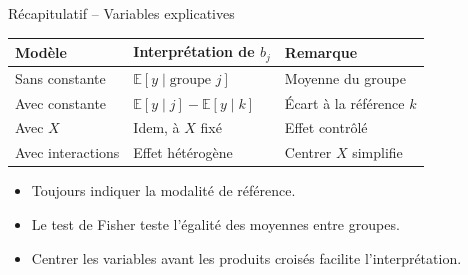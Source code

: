 \documentclass[11pt,aspectratio=169]{beamer}
\newcommand{\E}{\mathbb{E}}
\begin{document}
\begin{frame}{Récapitulatif -- Variables explicatives}

\begin{center}
    \small
    \renewcommand{\arraystretch}{1.3}
    \begin{tabular}{lll}
        \toprule
        \textbf{Modèle} & \textbf{Interprétation de $b_j$} & \textbf{Remarque} \\
        \midrule
        Sans constante & $\E[y \mid \text{groupe } j]$ & Moyenne du groupe \\
        Avec constante & $\E[y \mid j] - \E[y \mid k]$ & Écart à la référence $k$ \\
        Avec $X$ & Idem, à $X$ fixé & Effet contrôlé \\
        Avec interactions & Effet hétérogène & Centrer $X$ simplifie \\
        \bottomrule
    \end{tabular}
\end{center}

\vspace{0.3cm}

\begin{itemize}

\item Toujours indiquer la modalité de référence.\newline

\item Le test de Fisher teste l'égalité des moyennes entre groupes.\newline

\item Centrer les variables avant les produits croisés facilite l'interprétation.

\end{itemize}

\end{frame}
\end{document}
